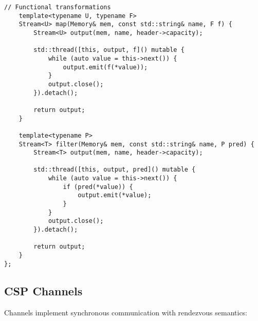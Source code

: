 \documentclass[11pt]{article}
\begin{document}
\begin{lstlisting}[caption={Lock-Free Stream with Ring Buffer}]
    // Functional transformations
    template<typename U, typename F>
    Stream<U> map(Memory& mem, const std::string& name, F f) {
        Stream<U> output(mem, name, header->capacity);
        
        std::thread([this, output, f]() mutable {
            while (auto value = this->next()) {
                output.emit(f(*value));
            }
            output.close();
        }).detach();
        
        return output;
    }
    
    template<typename P>
    Stream<T> filter(Memory& mem, const std::string& name, P pred) {
        Stream<T> output(mem, name, header->capacity);
        
        std::thread([this, output, pred]() mutable {
            while (auto value = this->next()) {
                if (pred(*value)) {
                    output.emit(*value);
                }
            }
            output.close();
        }).detach();
        
        return output;
    }
};
\end{lstlisting}

\subsection{CSP Channels}

Channels implement synchronous communication with rendezvous semantics:
\end{document}
